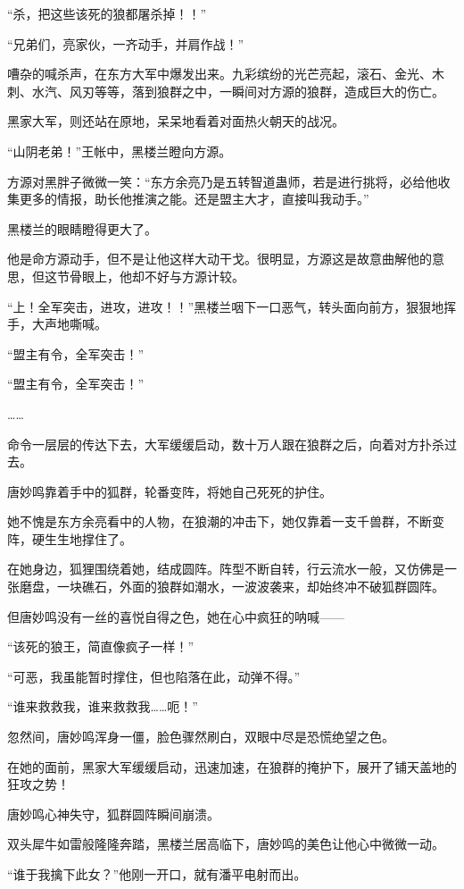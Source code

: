 \begin{this_body}
“杀，把这些该死的狼都屠杀掉！！”

“兄弟们，亮家伙，一齐动手，并肩作战！”

嘈杂的喊杀声，在东方大军中爆发出来。九彩缤纷的光芒亮起，滚石、金光、木刺、水汽、风刃等等，落到狼群之中，一瞬间对方源的狼群，造成巨大的伤亡。

黑家大军，则还站在原地，呆呆地看着对面热火朝天的战况。

“山阴老弟！”王帐中，黑楼兰瞪向方源。

方源对黑胖子微微一笑：“东方余亮乃是五转智道蛊师，若是进行挑将，必给他收集更多的情报，助长他推演之能。还是盟主大才，直接叫我动手。”

黑楼兰的眼睛瞪得更大了。

他是命方源动手，但不是让他这样大动干戈。很明显，方源这是故意曲解他的意思，但这节骨眼上，他却不好与方源计较。

“上！全军突击，进攻，进攻！！”黑楼兰咽下一口恶气，转头面向前方，狠狠地挥手，大声地嘶喊。

“盟主有令，全军突击！”

“盟主有令，全军突击！”

……

命令一层层的传达下去，大军缓缓启动，数十万人跟在狼群之后，向着对方扑杀过去。

唐妙鸣靠着手中的狐群，轮番变阵，将她自己死死的护住。

她不愧是东方余亮看中的人物，在狼潮的冲击下，她仅靠着一支千兽群，不断变阵，硬生生地撑住了。

在她身边，狐狸围绕着她，结成圆阵。阵型不断自转，行云流水一般，又仿佛是一张磨盘，一块礁石，外面的狼群如潮水，一波波袭来，却始终冲不破狐群圆阵。

但唐妙鸣没有一丝的喜悦自得之色，她在心中疯狂的呐喊——

“该死的狼王，简直像疯子一样！”

“可恶，我虽能暂时撑住，但也陷落在此，动弹不得。”

“谁来救救我，谁来救救我……呃！”

忽然间，唐妙鸣浑身一僵，脸色骤然刷白，双眼中尽是恐慌绝望之色。

在她的面前，黑家大军缓缓启动，迅速加速，在狼群的掩护下，展开了铺天盖地的狂攻之势！

唐妙鸣心神失守，狐群圆阵瞬间崩溃。

双头犀牛如雷般隆隆奔踏，黑楼兰居高临下，唐妙鸣的美色让他心中微微一动。

“谁于我擒下此女？”他刚一开口，就有潘平电射而出。


\end{this_body}
